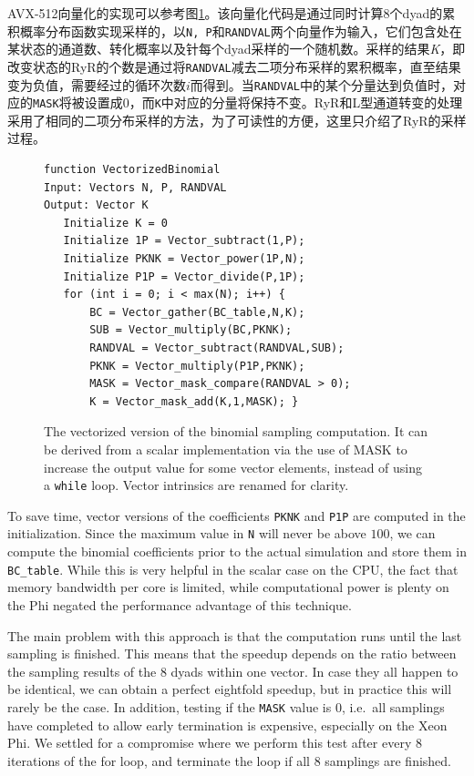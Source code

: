 AVX-512向量化的实现可以参考图\ref{Vecbinom}。该向量化代码是通过同时计算8个dyad的累积概率分布函数实现采样的，以{\tt N, P}和{\tt RANDVAL}两个向量作为输入，它们包含处在某状态的通道数、转化概率以及针每个dyad采样的一个随机数。采样的结果{\it K}，即改变状态的RyR的个数是通过将{\tt RANDVAL}减去二项分布采样的累积概率，直至结果变为负值，需要经过的循环次数$i$而得到。当{\tt RANDVAL}中的某个分量达到负值时，对应的{\tt MASK}将被设置成$0$，而{\tt K}中对应的分量将保持不变。RyR和L型通道转变的处理采用了相同的二项分布采样的方法，为了可读性的方便，这里只介绍了RyR的采样过程。

\begin{figure}[hbt]
\small\begin{verbatim}
function VectorizedBinomial
Input: Vectors N, P, RANDVAL
Output: Vector K
   Initialize K = 0
   Initialize 1P = Vector_subtract(1,P);
   Initialize PKNK = Vector_power(1P,N);
   Initialize P1P = Vector_divide(P,1P);
   for (int i = 0; i < max(N); i++) {	
       BC = Vector_gather(BC_table,N,K);
       SUB = Vector_multiply(BC,PKNK);
       RANDVAL = Vector_subtract(RANDVAL,SUB);
       PKNK = Vector_multiply(P1P,PKNK);
       MASK = Vector_mask_compare(RANDVAL > 0);
       K = Vector_mask_add(K,1,MASK); }
\end{verbatim}
\caption{The vectorized version of the binomial sampling computation. It can be derived from a scalar implementation via the use of MASK to increase the output value for some vector elements, instead of using a \texttt{while} loop. Vector intrinsics are renamed for clarity.}
\label{Vecbinom}
\end{figure}

To save time, vector versions of the coefficients \texttt{PKNK} and \texttt{P1P} are computed in the initialization. Since the maximum value in {\tt N} will never be above $100$, we can compute the binomial coefficients prior to the actual simulation and store them in {\tt BC\_table}. While this is very helpful in the scalar case on the CPU, the fact that memory bandwidth per core is limited, while computational power is plenty on the Phi negated the performance advantage of this technique.

The main problem with this approach is that the computation runs until the last sampling is finished. This means that the speedup depends on the ratio between the sampling results of the $8$ dyads within one vector. In case they all happen to be identical, we can obtain a perfect 
eightfold speedup, but in practice this will rarely be the case. In addition, testing if the \texttt{MASK} value is $0$, i.e.~all samplings have completed to allow early termination is expensive, especially on the Xeon Phi. We settled for a compromise where we perform this test after every $8$ iterations of the for loop, and terminate the loop if all $8$ samplings are finished. 


